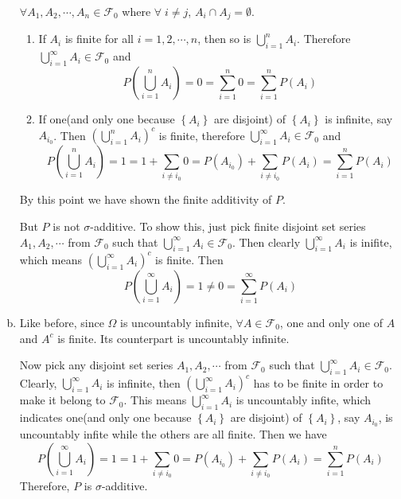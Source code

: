 \begin{list}{2.6.}{}
\begin{enumerate}[(a)]
    \par
    $\forall A_1, A_2, \cdots, A_n \in \mathcal{F}_0$ where $\forall\;i\neq j$, $A_i\cap A_j = \emptyset$.
    \begin{enumerate}[(1)]
    \item If $A_i$ is finite for all $i = 1, 2, \cdots, n$, then so is $\bigcup\limits_{i=1}^nA_i$. Therefore $\bigcup\limits_{i=1}^\infty A_i\in\mathcal{F}_0$ and 
      \[
        P\left(\bigcup\limits_{i=1}^nA_i\right) = 0 = \sum\limits_{i=1}^n 0 = \sum\limits_{i=1}^nP\left(A_i\right)
      \]
    \item If one(and only one because $\left\{A_i\right\}$ are disjoint) of $\left\{A_i\right\}$ is infinite, say $A_{i_0}$. Then $\left(\bigcup\limits_{i=1}^nA_i\right)^c$ is finite, therefore $\bigcup\limits_{i=1}^\infty A_i\in\mathcal{F}_0$ and 
      \[
        P\left(\bigcup\limits_{i=1}^nA_i\right) = 1
        = 1 + \sum\limits_{i\neq i_0}0
        = P\left(A_{i_0}\right) + \sum\limits_{i\neq i_0}P\left(A_i\right) = \sum\limits_{i=1}^nP\left(A_i\right)
      \]
    \end{enumerate}
    By this point we have shown the finite additivity of $P$.
    \par
    But $P$ is not $\sigma$-additive. To show this, just pick finite disjoint set series $A_1, A_2, \cdots $ from $\mathcal{F}_0$ such that $\bigcup\limits_{i=1}^\infty A_i\in\mathcal{F}_0$. Then clearly $\bigcup\limits_{i=1}^\infty A_i$ is inifite, which means $\left(\bigcup\limits_{i=1}^\infty A_i\right)^c$ is finite. Then
    \[
      P\left(\bigcup\limits_{i=1}^\infty A_i\right) = 1 \neq 0 = \sum\limits_{i=1}^\infty P\left(A_i\right)
    \]
  \item Like before, since $\Omega$ is uncountably infinite, $\forall A\in\mathcal{F}_0$, one and only one of $A$ and $A^c$ is finite. Its counterpart is uncountably infinite.
    \par
    Now pick any disjoint set series $A_1, A_2, \cdots$ from $\mathcal{F}_0$ such that $\bigcup\limits_{i=1}^\infty A_i\in\mathcal{F}_0$. Clearly, $\bigcup\limits_{i=1}^\infty A_i$ is infinite, then $\left(\bigcup\limits_{i=1}^\infty A_i\right)^c$ has to be finite in order to make it belong to $\mathcal{F}_0$. This means $\bigcup\limits_{i=1}^\infty A_i$ is uncountably infite, which indicates one(and only one because $\left\{A_i\right\}$ are disjoint) of $\left\{A_i\right\}$, say $A_{i_0}$,  is uncountably infite while the others are all finite. Then we have
    \[
      P\left(\bigcup\limits_{i=1}^\infty A_i\right) = 1 = 1 + \sum\limits_{i\neq i_0}0
      = P\left(A_{i_0}\right) + \sum\limits_{i\neq i_0}P\left(A_i\right) = \sum\limits_{i=1}^nP\left(A_i\right)
    \]
    Therefore, $P$ is $\sigma$-additive.
  \end{enumerate}

\end{list}




\clearpage{}



